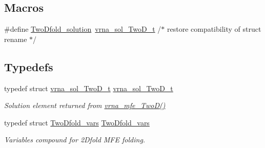 \subsection*{Macros}
\begin{DoxyCompactItemize}
\item 
\#define \mbox{\hyperlink{group__kl__neighborhood__mfe_ga09e71024abb1a2bd19d9137596376e15}{Two\+Dfold\+\_\+solution}}~\mbox{\hyperlink{group__kl__neighborhood__mfe_structvrna__sol___two_d__t}{vrna\+\_\+sol\+\_\+\+Two\+D\+\_\+t}}         /$\ast$ restore compatibility of struct rename $\ast$/
\end{DoxyCompactItemize}
\subsection*{Typedefs}
\begin{DoxyCompactItemize}
\item 
typedef struct \mbox{\hyperlink{group__kl__neighborhood__mfe_structvrna__sol___two_d__t}{vrna\+\_\+sol\+\_\+\+Two\+D\+\_\+t}} \mbox{\hyperlink{group__kl__neighborhood__mfe_ga6a81a58268d250309712549a3fa0aab2}{vrna\+\_\+sol\+\_\+\+Two\+D\+\_\+t}}
\begin{DoxyCompactList}\small\item\em Solution element returned from \mbox{\hyperlink{group__kl__neighborhood__mfe_ga243c288b463147352829df04de6a2f77}{vrna\+\_\+mfe\+\_\+\+Two\+D()}} \end{DoxyCompactList}\item 
typedef struct \mbox{\hyperlink{group__kl__neighborhood__mfe_struct_two_dfold__vars}{Two\+Dfold\+\_\+vars}} \mbox{\hyperlink{group__kl__neighborhood__mfe_gaf4f514010a14f9d59d850742b3e96954}{Two\+Dfold\+\_\+vars}}
\begin{DoxyCompactList}\small\item\em Variables compound for 2\+Dfold M\+FE folding. \end{DoxyCompactList}\end{DoxyCompactItemize}
